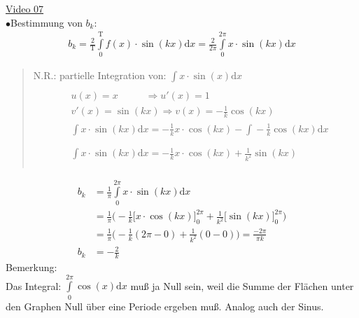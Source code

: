 \href{https://youtu.be/Awz46xIlbyc}{Video 07}\\
$ \bullet $\;Bestimmung von $ b_k $:\\
\begin{align*}
b_k=\frac{2}{\mathrm{T}}\int\limits_{0}^{\mathrm{T}} f(x)\cdot \sin(kx)\mathrm{d}x=\frac{2}{2\pi}\int\limits_{0}^{2\pi} x\cdot \sin(kx)\mathrm{d}x
\end{align*}
\begin{quote}
	N.R.: partielle Integration von: $ \int\limits_{}^{} x\cdot \sin(x)\mathrm{d}x $\\
	\begin{align*}
	&u(x)=x\;\;\;\;\;\;\;\;\;\;\Rightarrow u'(x)=1\\
	&v'(x)=\sin(kx)\Rightarrow v(x)=-\frac{1}{k}\cos(kx)\\
	&\int\limits_{}^{}x\cdot \sin(kx)\mathrm{d}x=-\frac{1}{k}x\cdot \cos(kx)-\int\limits_{}^{} -\frac{1}{k}\cos(kx)\mathrm{d}x\\
	&\int\limits_{}^{}x\cdot \sin(kx)\mathrm{d}x=-\frac{1}{k}x\cdot \cos(kx)+\frac{1}{k^2}\sin(kx)
	\end{align*}
\end{quote}
\begin{align*}
b_k&=\frac{1}{\pi}\int\limits_{0}^{2\pi} x\cdot \sin(kx)\mathrm{d}x\\
&=\frac{1}{\pi}\bigg(-\frac{1}{k}\bigg[x\cdot \cos(kx)\bigg]^{2\pi}_0+\frac{1}{k^2}\bigg[\sin(kx)\bigg]^{2\pi}_0\bigg)\\
&=\frac{1}{\pi}\bigg(-\frac{1}{k}(2\pi-0)+\frac{1}{k^2}(0-0)\bigg)=\frac{-2\pi}{\pi k}\\
b_k&=-\frac{2}{k}
\end{align*}
Bemerkung:\\ Das Integral: $ \int\limits_{0}^{2\pi} \cos(x)\mathrm{d}x $ muß ja Null sein, weil die Summe der Flächen unter den Graphen Null über eine Periode ergeben muß. Analog auch der Sinus. \\
\\
\\
\\
\\
\\
\\
